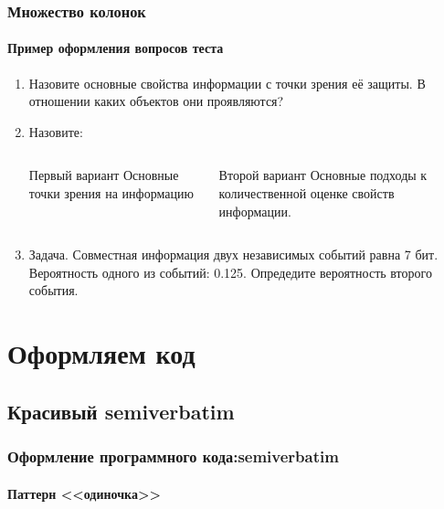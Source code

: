 \begin{frame}
    \frametitle{Множество колонок}
    \framesubtitle{Пример оформления вопросов теста}
    
    \begin{enumerate}

        \item \label{enumer:infoProperties} Назовите основные свойства информации с точки зрения её защиты. В отношении каких объектов они проявляются?
        \item Назовите:
        \begin{columns}
                \begin{block}{Первый вариант}
                    Основные \alert{точки зрения} на информацию
                \end{block}
            
                \begin{block}{Второй вариант}
                    Основные \alert{подходы} к количественной оценке свойств информации.
                \end{block}
        \end{columns}
    
        \item Задача. Совместная информация двух независимых событий равна 7 бит. Вероятность одного из событий: 0.125. Опредедите вероятность второго события.
    \end{enumerate}
\end{frame}


\section{Оформляем код}

\subsection{Красивый semiverbatim} 

\begin{frame}[fragile]
    \frametitle{Оформление программного кода:semiverbatim}
    \framesubtitle{Паттерн <<одиночка>>}
\begin{semiverbatim}
\end{semiverbatim}
\end{frame}


